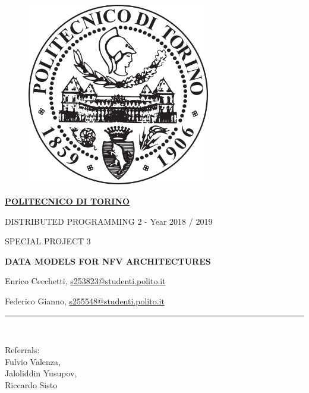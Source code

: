 \documentclass[11pt, english]{article}
\makeatletter
\newcommand*{\email}[1]{%
    \normalsize\href{mailto:#1}{#1}\par
}
\gdef\@date{Year 2018 / 2019}
\makeatother
\begin{document}
\begin{titlepage}

\begin{center}
\vspace*{-1in}
\begin{figure}[htb]
\begin{center}
\includegraphics[width=8cm]{politoLogo.png}
\end{center}
\end{figure}

\begin{large}
\textbf{\underline{POLITECNICO DI TORINO}} \\
\end{large}
\vspace*{0.15in}
DISTRIBUTED PROGRAMMING 2 - \@date \\ 
\vspace*{0.4in}
\begin{large}
SPECIAL PROJECT 3 \\
\end{large}
\vspace*{0.2in}
\begin{Large}
\textbf{DATA MODELS FOR NFV ARCHITECTURES} \\
\end{Large}
\vspace*{0.3in}
\begin{large}
Enrico Cecchetti, \email{s253823@studenti.polito.it}
Federico Gianno, \email{s255548@studenti.polito.it} 
\end{large}
\vspace*{0.3in}
\rule{80mm}{0.1mm}\\
\vspace*{0.1in}
\begin{large}
Referrals: \\
Fulvio Valenza, \\
Jaloliddin Yusupov, \\
Riccardo Sisto \\
\end{large}
\end{center}
\end{titlepage}
\end{document}
